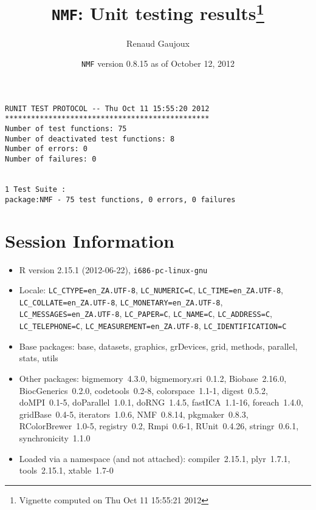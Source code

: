 \documentclass[10pt]{article}
\author{Renaud Gaujoux}
\title{\texttt{NMF}: Unit testing results\footnote{Vignette computed  on Thu Oct 11 15:55:21 2012}}
\date{\texttt{NMF} version 0.8.15 as of October 12, 2012}
\begin{document}
\maketitle

\begin{verbatim}
RUNIT TEST PROTOCOL -- Thu Oct 11 15:55:20 2012 
*********************************************** 
Number of test functions: 75 
Number of deactivated test functions: 8 
Number of errors: 0 
Number of failures: 0 

 
1 Test Suite : 
package:NMF - 75 test functions, 0 errors, 0 failures
\end{verbatim}

\section*{Session Information}
\begin{itemize}\raggedright
  \item R version 2.15.1 (2012-06-22), \verb|i686-pc-linux-gnu|
  \item Locale: \verb|LC_CTYPE=en_ZA.UTF-8|, \verb|LC_NUMERIC=C|, \verb|LC_TIME=en_ZA.UTF-8|, \verb|LC_COLLATE=en_ZA.UTF-8|, \verb|LC_MONETARY=en_ZA.UTF-8|, \verb|LC_MESSAGES=en_ZA.UTF-8|, \verb|LC_PAPER=C|, \verb|LC_NAME=C|, \verb|LC_ADDRESS=C|, \verb|LC_TELEPHONE=C|, \verb|LC_MEASUREMENT=en_ZA.UTF-8|, \verb|LC_IDENTIFICATION=C|
  \item Base packages: base, datasets, graphics, grDevices, grid,
    methods, parallel, stats, utils
  \item Other packages: bigmemory~4.3.0, bigmemory.sri~0.1.2,
    Biobase~2.16.0, BiocGenerics~0.2.0, codetools~0.2-8,
    colorspace~1.1-1, digest~0.5.2, doMPI~0.1-5, doParallel~1.0.1,
    doRNG~1.4.5, fastICA~1.1-16, foreach~1.4.0, gridBase~0.4-5,
    iterators~1.0.6, NMF~0.8.14, pkgmaker~0.8.3, RColorBrewer~1.0-5,
    registry~0.2, Rmpi~0.6-1, RUnit~0.4.26, stringr~0.6.1,
    synchronicity~1.1.0
  \item Loaded via a namespace (and not attached): compiler~2.15.1,
    plyr~1.7.1, tools~2.15.1, xtable~1.7-0
\end{itemize}
\end{document}
